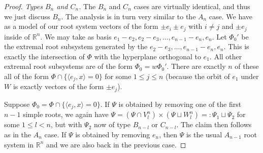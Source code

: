 \documentclass[12pt]{amsart}
\theoremstyle{remark}
\begin{document}
\begin{proof}

\medskip

    \noindent \textit{Types $B_n$ and $C_n$.} The $B_n$ and $C_n$ cases are virtually identical, and thus we just discuss $B_n$. The analysis is in turn very similar to the $A_n$ case. We have as a model of our root system vectors of the form $\pm e_i \pm e_j$ with $i \neq j$ and $\pm e_j$ inside of $\mathbb{R}^n$. We may take as basis $e_1 - e_2, e_2 - e_3, \dots, e_{n-1} - e_n, e_n$. Let $\Phi_0'$ be the extremal root subsystem generated by the $e_2 - e_3, \dots, e_{n-1} - e_n, e_n$. This is exactly the intersection of $\Phi$ with the hyperplane orthogonal to $e_1$. All other extremal root subsystems are of the form $\Phi_0=w \Phi_0'$. There are exactly $n$ of these all of the form $\Phi \cap \{\langle e_j, x \rangle = 0\}$ for some $1 \leq j \leq n$ (because the orbit of $e_1$ under $W$ is exactly vectors of the form $\pm e_j$).

    Suppose $\Phi_0 = \Phi \cap \{ \langle e_j, x \rangle = 0\}$. If $\Psi$ is obtained by removing one of the first $n-1$ simple roots, we again have $\Psi=(\Psi\cap V^{n}_l) \times (\Psi\sqcup W^{n}_l)=:\Psi_1\sqcup\Psi_2$ for some $1\le l<n$, but with $\Psi_2$ now of type $B_{n-l}$ or $C_{n-l}$. The claim then follows as in the $A_n$ case. If $\Psi$ is obtained by removing $e_n$, then $\Psi$ is the usual $A_{n-1}$ root system in $\mathbb{R}^{n}$ and we are also back in the previous case.
    

\end{proof}
\end{document}
